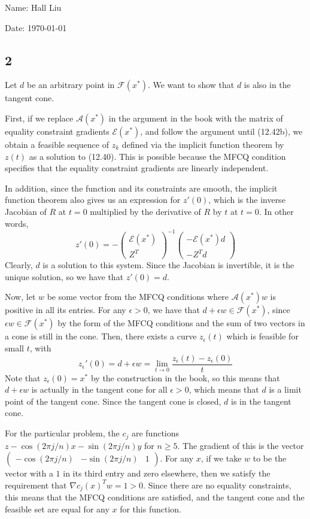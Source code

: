 \documentclass{article}
\newcommand{\ep}{\epsilon}
\newcommand{\openm}{\begin{pmatrix}}
\newcommand{\closem}{\end{pmatrix}}
\begin{document}
Name: Hall Liu

Date: \today 
\vspace{1.5cm}
\subsection*{2}
Let $d$ be an arbitrary point in $\mathscr{F}(x^*)$. We want to show that $d$ is also in the tangent cone.

First, if we replace $\mathscr{A}(x^*)$ in the argument in the book with the matrix of equality constraint gradients $\mathscr{E}(x^*)$, and follow the argument until (12.42b), we obtain a feasible sequence of $z_k$ defined via the implicit function theorem by $z(t)$ as a solution to (12.40). This is possible because the MFCQ condition specifies that the equality constraint gradients are linearly independent. 

In addition, since the function and its constraints are smooth, the implicit function theorem also gives us an expression for $z'(0)$, which is the inverse Jacobian of $R$ at $t=0$ multiplied by the derivative of $R$ by $t$ at $t=0$. In other words, 
\[z'(0)=-\openm \mathscr{E}(x^*)\\Z^T\closem^{-1}\openm-\mathscr{E}(x^*)d\\-Z^Td\closem\]
Clearly, $d$ is a solution to this system. Since the Jacobian is invertible, it is the unique solution, so we have that $z'(0)=d$.

Now, let $w$ be some vector from the MFCQ conditions where $\mathscr{A}(x^*)w$ is positive in all its entries. For any $\ep>0$, we have that $d+\ep w\in\mathscr{F}(x^*)$, since $\ep w\in\mathscr{F}(x^*)$ by the form of the MFCQ conditions and the sum of two vectors in a cone is still in the cone. Then, there exists a curve $z_\ep(t)$ which is feasible for small $t$, with 
\[z_\ep'(0)=d+\ep w=\lim_{t\to 0}\frac{z_\ep(t)-z_\ep(0)}{t}\]
Note that $z_\ep(0)=x^*$ by the construction in the book, so this means that $d+\ep w$ is actually in the tangent cone for all $\ep>0$, which means that $d$ is a limit point of the tangent cone. Since the tangent cone is closed, $d$ is in the tangent cone.

For the particular problem, the $c_j$ are functions $z-\cos(2\pi j/n)x-\sin(2\pi j/n)y$ for $n\geq5$. The gradient of this is the vector $\openm -\cos(2\pi j/n)&-\sin(2\pi j/n)&1\closem$. For any $x$, if we take $w$ to be the vector with a $1$ in its third entry and zero elsewhere, then we satisfy the requirement that $\nabla c_j(x)^Tw=1>0$. Since there are no equality constraints, this means that the MFCQ conditions are satisfied, and the tangent cone and the feasible set are equal for any $x$ for this function.
\end{document}
